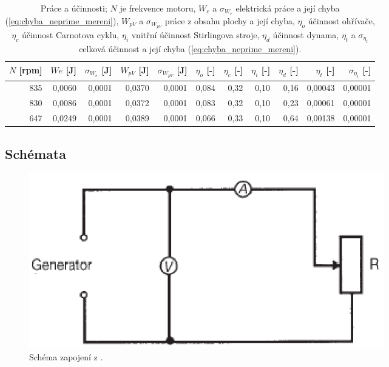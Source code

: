 \documentclass[english]{article}
\begin{document}
\begin{table}[htbp]
  \centering
  
    \begin{tabular}{|r|r|r|r|r|r|r|r|r|r|r|}
    \hline
    $N$ [rpm] & $We$ [J] & $\sigma_{W_e}$ [J] & $W_{pV}$ [J] & $\sigma_{W_{pV}}$ [J] & $\eta_o$ [-] & $\eta_c$ [-] & $\eta_i$ [-] & $\eta_d$ [-] & $\eta_t$ [-] & $\sigma_{\eta_t}$ [-] \bigstrut\\
    \hline
    835   & 0,0060 & 0,0001 & 0,0370 & 0,0001 & 0,084 & 0,32  & 0,10  & 0,16  & 0,00043 & 0,00001 \bigstrut\\
    \hline
    830   & 0,0086 & 0,0001 & 0,0372 & 0,0001 & 0,083 & 0,32  & 0,10  & 0,23  & 0,00061 & 0,00001 \bigstrut\\
    \hline
    647   & 0,0249 & 0,0001 & 0,0389 & 0,0001 & 0,066 & 0,33  & 0,10  & 0,64  & 0,00138 & 0,00001 \bigstrut\\
    \hline
    \end{tabular}%
    
    
  \caption{Práce a účinnosti; $N$ je frekvence motoru, $W_e$ a $\sigma_{W_e}$ elektrická práce a její chyba (\ref{eq:chyba_neprime_mereni}), $W_{pV}$ a $\sigma_{W_{pV}}$ práce z obsahu plochy a její chyba, $\eta_o$ účinnost ohřívače, $\eta_c$ účinnost Carnotova cyklu, $\eta_i$ vnitřní účinnost Stirlingova stroje, $\eta_d$ účinnost dynama, $\eta_t$ a $\sigma_{\eta_t}$ celková účinnost a její chyba (\ref{eq:chyba_neprime_mereni}).}
  \label{tab:ucinnosti}%
\end{table}%


\clearpage
\subsection{Schémata}

	\begin{figure}[h!]
		\begin{center}
		    	\includegraphics[width=0.6\linewidth]{att/schema.png}
				\caption{Schéma zapojení z \cite{bib:zadani}.}
				\label{fig:s_aparatura_moment}
					    	
				
		\end{center}
	\end{figure}
	
\end{document}

